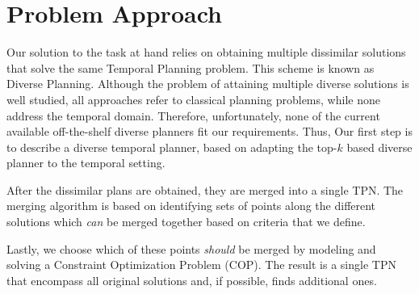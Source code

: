 \section{Problem Approach}
\label{intro: Problem Approach}

Our solution to the task at hand relies on obtaining multiple dissimilar solutions that solve the same Temporal Planning problem.
This scheme is known as Diverse Planning. Although the problem of attaining multiple diverse solutions is well studied, all approaches refer to classical planning problems, while none address the temporal domain. Therefore, unfortunately, none of the current available off-the-shelf diverse planners  \cite{bryce2014landmark,nguyen2012generating,srivastava2007domain,katz2019reshaping} fit our requirements. Thus, Our first step is to describe a diverse temporal planner, based on adapting the top-$k$ based diverse planner \cite{katz2019reshaping} to the temporal setting. 

After the dissimilar plans are obtained, they are merged into a single TPN. 
The merging algorithm is based on identifying sets of points along the different solutions which \emph{can} be merged together based on criteria that we define.

Lastly, we choose which of these points \emph{should} be merged by modeling and solving a Constraint Optimization Problem (COP). The result is a single TPN that encompass all original solutions and, if possible, finds additional ones.



